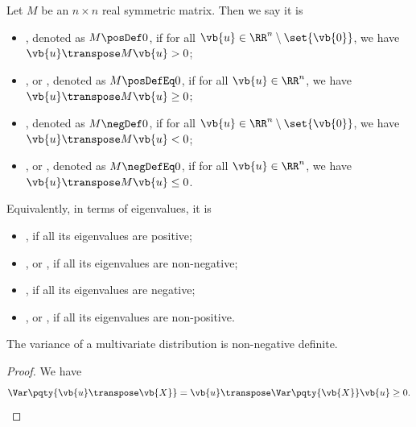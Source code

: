 \begin{definition}
    \label{def:positive-negative-definiteness}%
    Let \(M\) be an \(n \times n\) real symmetric matrix. Then we say it is
    \begin{itemize}
        \item {}, denoted as \(M \posDef 0\), if for all \(\vb{u} \in \RR^n \setminus \set{\vb{0}}\), we have \(\vb{u}\transpose M \vb{u} > 0\);
        \item {}, or , denoted as \(M \posDefEq 0\), if for all \(\vb{u} \in \RR^n\), we have \(\vb{u} \transpose M \vb{u} \geq 0\);
        \item {}, denoted as \(M \negDef 0\), if for all \(\vb{u} \in \RR^n \setminus \set{\vb{0}}\), we have \(\vb{u}\transpose M \vb{u} < 0\);
        \item {}, or , denoted as \(M \negDefEq 0\), if for all \(\vb{u} \in \RR^n\), we have \(\vb{u} \transpose M \vb{u} \leq 0\).
    \end{itemize}

    Equivalently, in terms of eigenvalues, it is
    \begin{itemize}
        \item {}, if all its eigenvalues are positive;
        \item {}, or , if all its eigenvalues are non-negative;
        \item {}, if all its eigenvalues are negative;
        \item {}, or , if all its eigenvalues are non-positive.
    \end{itemize}
\end{definition}

\begin{claim}
    \label{claim:variance-non-negative-definite}%
    The variance of a multivariate distribution is non-negative definite.
\end{claim}

\begin{proof}
    We have
    \[
        \Var\pqty{\vb{u}\transpose \vb{X}} = \vb{u}\transpose \Var\pqty{\vb{X}} \vb{u} \geq 0.
    \]
\end{proof}

